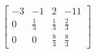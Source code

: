\documentclass[preview]{standalone}
\begin{document}
\begin{align*}
\left[\begin{array}{ccc|c}-3 & -1 & 2 & -11 \\0 & \frac{1}{3} & \frac{1}{3} & \frac{2}{3} \\0 & 0 & \frac{8}{3} & \frac{8}{3}\end{array}\right]
\end{align*}
\end{document}
